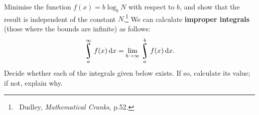 \begin{questions}
  \questioE Minimise the function $ f(x) = b\log_b N $ with respect to $ b $, and show that the result is independent of the
            constant $ N $.\footnote{~Dudley, \textit{Mathematical Cranks}, p.52.}
  \questioS We can calculate \textbf{improper integrals} (those where the bounds are infinite) as follows:
            \begin{displaymath}
              \rint^{\infty}_a f(x) \dif{x} = \lim_{b \to \infty} \rint^b_a f(x) \dif{x}.
            \end{displaymath}
            Decide whether each of the integrals given below exists. If so, calculate its value; if not, explain why.
    \begin{multicols}{3}
\end{multicols}
\end{questions}
